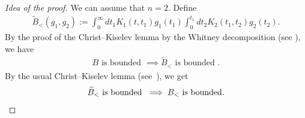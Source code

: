 \documentclass[10pt,a4paper]{amsart}
\newcommand{\wt}{\widetilde}
\newcommand{\I}{\infty}
\begin{document}
\begin{proof}[Idea of the proof]
We can assume that $n=2$. Define
\begin{align}
\wt{B}_< (g_1,g_2) := \int_0^\I dt_1 K_1(t,t_1)g_1(t_1) \int_0^{t_1} dt_2 K_2(t_1,t_2)g_2(t_2).
\end{align}
By the proof of the Christ--Kiselev lemma by the Whitney decomposition (see \cite{2000T}), we have
\begin{align}
B \text{ is bounded } \implies \wt{B}_< \text{ is bounded }.
\end{align}
By the usual Christ--Kiselev lemma (see~\cite{2001CK}), we get
\begin{equation}
\wt{B}_< \text{ is bounded } \implies B_< \text{ is bounded}.\qedhere
\end{equation}
\end{proof}
\end{document}
